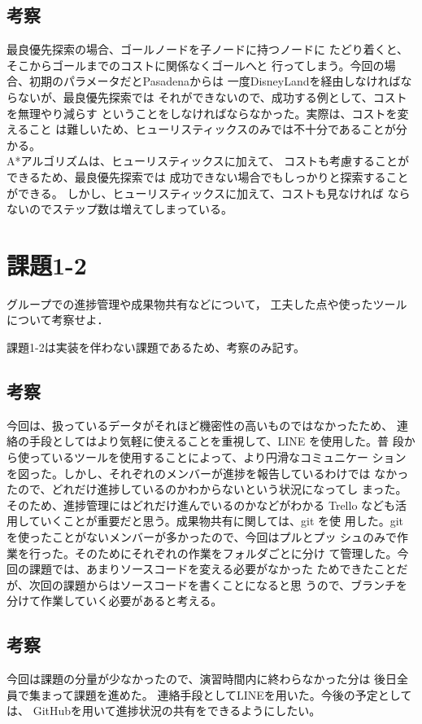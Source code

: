 \documentclass{jarticle}
\begin{document}
\subsection{考察}
最良優先探索の場合、ゴールノードを子ノードに持つノードに
たどり着くと、そこからゴールまでのコストに関係なくゴールへと
行ってしまう。今回の場合、初期のパラメータだとPasadenaからは
一度DisneyLandを経由しなければならないが、最良優先探索では
それができないので、成功する例として、コストを無理やり減らす
ということをしなければならなかった。実際は、コストを変えること
は難しいため、ヒューリスティックスのみでは不十分であることが分かる。\\
A*アルゴリズムは、ヒューリスティックスに加えて、
コストも考慮することができるため、最良優先探索では
成功できない場合でもしっかりと探索することができる。
しかし、ヒューリスティックスに加えて、コストも見なければ
ならないのでステップ数は増えてしまっている。


\section{課題1-2}
\begin{screen}
  グループでの進捗管理や成果物共有などについて，
  工夫した点や使ったツールについて考察せよ．
\end{screen}

課題1-2は実装を伴わない課題であるため、考察のみ記す。

\subsection{考察}
  今回は、扱っているデータがそれほど機密性の高いものではなかったため、
  連絡の手段としてはより気軽に使えることを重視して、LINE を使用した。普
  段から使っているツールを使用することによって、より円滑なコミュニケー
  ションを図った。しかし、それぞれのメンバーが進捗を報告しているわけでは
  なかったので、どれだけ進捗しているのかわからないという状況になってし
  まった。そのため、進捗管理にはどれだけ進んでいるのかなどがわかる Trello
  なども活用していくことが重要だと思う。成果物共有に関しては、git を使
  用した。git を使ったことがないメンバーが多かったので、今回はプルとプッ
  シュのみで作業を行った。そのためにそれぞれの作業をフォルダごとに分け
  て管理した。今回の課題では、あまりソースコードを変える必要がなかった
  ためできたことだが、次回の課題からはソースコードを書くことになると思
  うので、ブランチを分けて作業していく必要があると考える。

\subsection{考察}
  今回は課題の分量が少なかったので、演習時間内に終わらなかった分は
  後日全員で集まって課題を進めた。
  連絡手段としてLINEを用いた。今後の予定としては、
  GitHubを用いて進捗状況の共有をできるようにしたい。
\end{document}
